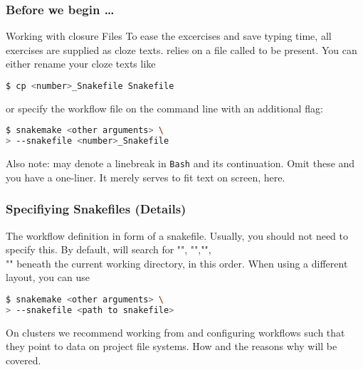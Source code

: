 \begin{frame}[fragile]
  \frametitle{Before we begin \ldots}
  \begin{exampleblock}{Working with closure Files}
    To ease the excercises and save typing time, all exercises are supplied as cloze texts.\linebreak
    \Snakemake{} relies on a file called  to be present. You can either rename your cloze texts like
    \begin{lstlisting}[language=Bash, style=Shell]
$ cp <number>_Snakefile Snakefile
    \end{lstlisting}
    or specify the workflow file on the command line with an additional flag:
    \begin{lstlisting}[language=Bash, style=Shell]
$ snakemake <other arguments> \
> --snakefile <number>_Snakefile
    \end{lstlisting}
    Also note: \altverb{\\} may denote a linebreak in \texttt{Bash} and \altverb{>} its continuation. Omit these and you have a one-liner. It merely serves to fit text on screen, here.
  \end{exampleblock}
\end{frame}

\begin{frame}[fragile]
	\frametitle{Specifiying Snakefiles (Details)}
	\begin{docs}
		The workflow definition in form of a snakefile. Usually, you should not need to specify this. By default, \Snakemake{} will search for "", "","", \\"" beneath the current working directory, in this order.\newline
		When using a different layout, you can use
		\begin{lstlisting}[language=Bash, style=Shell]
$ snakemake <other arguments> \
> --snakefile <path to snakefile>
	    \end{lstlisting}
	\end{docs}
    \pause
    \begin{hint}
      On clusters we recommend working from  and configuring workflows such that they point to data on project file systems. How and the reasons why will be covered.
    \end{hint}
\end{frame}


